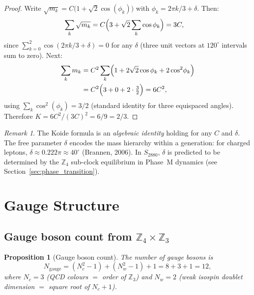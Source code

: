 \documentclass[11pt,a4paper]{article}
\newtheorem{proposition}[theorem]{Proposition}
\theoremstyle{remark}
\newtheorem{remark}[theorem]{Remark}
\begin{document}
\begin{proof}
  Write $\sqrt{m_k} = C\bigl(1 + \sqrt{2}\cos(\phi_k)\bigr)$ with $\phi_k = 2\pi k/3 + \delta$.
  Then:
  \begin{align}
    \sum_k \sqrt{m_k} &= C\Bigl(3 + \sqrt{2}\sum_k \cos\phi_k\Bigr) = 3C ,
    \label{eq:sum_sqrt}
  \end{align}
  since $\sum_{k=0}^2 \cos(2\pi k/3 + \delta) = 0$ for any $\delta$ (three unit vectors at
  $120^\circ$ intervals sum to zero).  Next:
  \begin{align}
    \sum_k m_k &= C^2 \sum_k \Bigl(1 + 2\sqrt{2}\cos\phi_k + 2\cos^2\!\phi_k\Bigr) \notag \\
               &= C^2 \Bigl(3 + 0 + 2 \cdot {\textstyle\frac{3}{2}}\Bigr) = 6C^2 ,
    \label{eq:sum_m}
  \end{align}
  using $\sum_k \cos^2(\phi_k) = 3/2$ (standard identity for three equispaced angles).
  Therefore $K = 6C^2 / (3C)^2 = 6/9 = 2/3$.
\end{proof}

\begin{remark}
  The Koide formula is an \emph{algebraic identity} holding for any $C$ and $\delta$.
  The free parameter $\delta$ encodes the mass hierarchy within a generation: for charged
  leptons, $\delta \approx 0.222\pi \approx 40^\circ$ (Brannen, 2006).
  In $S_{2880}$, $\delta$ is predicted to be determined by the $\mathbb{Z}_4$ sub-clock
  equilibrium in Phase~M dynamics (see Section~\ref{sec:phase_transition}).
\end{remark}

\section{Gauge Structure}
\label{sec:gauge}

\subsection{Gauge boson count from $\mathbb{Z}_4 \times \mathbb{Z}_3$}

\begin{proposition}[Gauge boson count]
  The number of gauge bosons is
  \begin{equation}
    N_{\mathrm{gauge}} = (N_c^2-1) + (N_w^2-1) + 1 = 8 + 3 + 1 = 12 ,
  \label{eq:Ngauge}
  \end{equation}
  where $N_c = 3$ (QCD colours $=$ order of $\mathbb{Z}_3$) and $N_w = 2$ (weak isospin
  doublet dimension $=$ square root of $N_c+1$).
\end{proposition}
\end{document}
